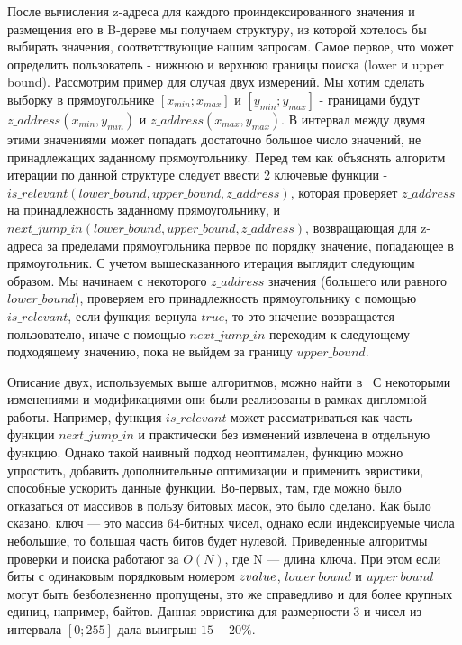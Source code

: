 После вычисления z-адреса для каждого проиндексированного значения и размещения его в B-дереве мы получаем структуру, из которой хотелось бы выбирать значения, соответствующие нашим запросам. Самое первое, что может определить пользователь - нижнюю и верхнюю границы поиска (lower и upper bound). Рассмотрим пример для случая двух измерений. Мы хотим сделать выборку в прямоугольнике $[x_{min};x_{max}]$ и $[y_{min}; y_{max}]$ - границами будут $z\_address(x_{min}, y_{min})$ и $z\_address(x_{max}, y_{max})$. В интервал между двумя этими значениями может попадать достаточно большое число значений, не принадлежащих заданному прямоугольнику. Перед тем как объяснять алгоритм итерации по данной структуре следует ввести 2 ключевые функции - $is\_relevant(lower\_bound, upper\_bound, z\_address)$, которая проверяет $z\_address$ на принадлежность заданному прямоугольнику, и $next\_jump\_in(lower\_bound, upper\_bound, z\_address)$, возвращающая для z-адреса за пределами прямоугольника первое по порядку значение, попадающее в прямоугольник.
С учетом вышесказанного итерация выглядит следующим образом. Мы начинаем с некоторого $z\_address$ значения (большего или равного $lower\_bound$), проверяем его принадлежность прямоугольнику с помощью  $is\_relevant$, если функция вернула $true$, то это значение возвращается пользователю, иначе с помощью $next\_jump\_in$ переходим к следующему подходящему значению, пока не выйдем за границу $upper\_bound$.

Описание двух, используемых выше алгоритмов, можно найти в~\cite{ramsak2000integrating, widhopf2005advanced, prukl2007relavcni} С некоторыми изменениями и модификациями они были реализованы в рамках дипломной работы. Например, функция $is\_relevant$ может рассматриваться как часть функции $next\_jump\_in$ и практически без изменений извлечена в отдельную функцию. Однако такой наивный подход неоптимален, функцию можно упростить, добавить дополнительные оптимизации и применить эвристики, способные ускорить данные функции.
Во-первых, там, где можно было отказаться от массивов в пользу битовых масок, это было сделано.
Как было сказано, ключ --- это массив 64-битных чисел, однако если индексируемые числа небольшие, то большая часть битов будет нулевой.
Приведенные алгоритмы проверки и поиска работают за $O(N)$, где N ---
длина ключа. При этом если биты с одинаковым порядковым номером $z\-value$, $lower\ bound$ и $upper\ bound$ могут быть безболезненно
пропущены, это же справедливо и для более крупных единиц, например, байтов. Данная эвристика для размерности $3$ и чисел из интервала $[0; 255]$ дала выигрыш $15-20\%$.

